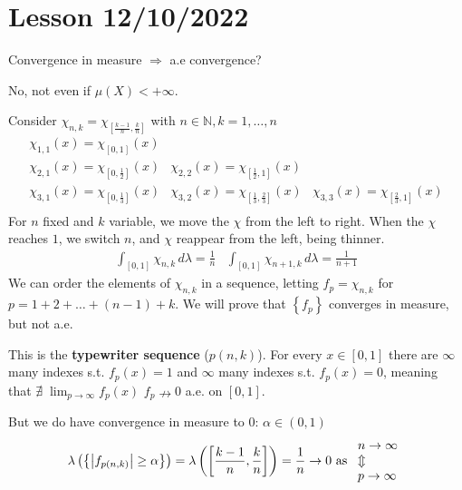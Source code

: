 \section{Lesson 12/10/2022}
\begin{remark}
    Convergence in measure \(\Longrightarrow\) a.e convergence?

    No, not even if \(\mu(X) < +\infty\).

    Consider \(\chi_{n,k} = \chi_{[\frac{k-1}{n}, \frac{k}{n}]}\) with \(n \in \mathbb{N}, k = 1, \ldots, n\)
    \[
        \begin{array}{ccc}
            \chi_{1,1}(x) = \chi_{[0, 1]}(x) & & \\
            \chi_{2,1}(x) = \chi_{[0, \frac{1}{2}]}(x) & \chi_{2,2}(x) = \chi_{[\frac{1}{2}, 1]}(x) & \\
            \chi_{3,1}(x) = \chi_{[0, \frac{1}{3}]}(x) & \chi_{3,2}(x) = \chi_{[\frac{1}{3}, \frac{2}{3}]}(x) &\chi_{3,3}(x) = \chi_{[\frac{2}{3}, 1]}(x) \\
        \end{array}
    \]
    For \(n\) fixed and \(k\) variable, we move the \(\chi\) from the left to right. When the \(\chi\) reaches \(1\), we switch \(n\), and \(\chi\) reappear from the left, being thinner. 
    \[
        \begin{array}{cc}
            \int_{[0,1]} \chi_{n,k} \, d\lambda = \frac{1}{n} & \int_{[0,1]} \chi_{n+1, k} \, d\lambda = \frac{1}{n+1}
        \end{array}
    \]
    We can order the elements of \(\chi_{n,k}\) in a sequence, letting
    \(f_p = \chi_{n,k}\) for \(p=1+2+\ldots+(n-1)+k\). We will prove that \(\left\{ f_p \right\}\) converges in measure, but not a.e. 

    This is the \textbf{typewriter sequence} (\(p(n,k)\)). For every \(x \in [0,1]\) there are \(\infty\) many indexes s.t. \(f_p(x) = 1\) and \(\infty\) many indexes s.t. \(f_p(x) = 0\), meaning that \(\nexists \; \lim_{p\to \infty} f_p(x)\)
    \( f_p \nrightarrow 0 \) a.e. on \(\left[ 0, 1\right]\).

    But we do have convergence in measure to \(0\): \(\alpha \in (0,1)\)
    \[
        \lambda\left(\left\{ \abs{f_{p(n,k)}} \geq \alpha \right\}\right) = \lambda \left(\left[ \frac{k-1}{n}, \frac{k}{n} \right]\right) = \frac{1}{n} \to 0 \mbox{ as } \begin{array}{l}
            n\to \infty \\
            \Updownarrow \\
            p \to \infty        
        \end{array}
    \]
\end{remark}

